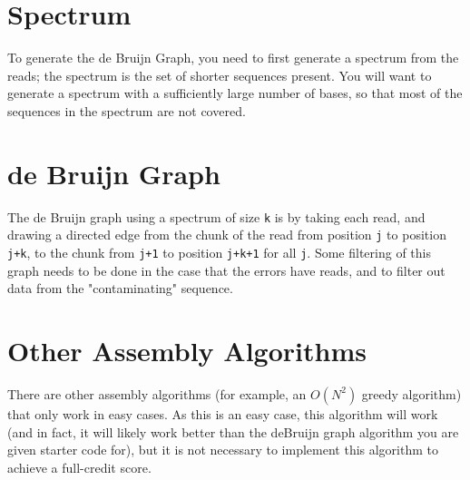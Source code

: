 \documentclass{article}
\begin{document}
\section*{Spectrum}

To generate the de Bruijn Graph, you need to first generate a spectrum from the reads; the spectrum is the set of shorter sequences present.  You will want to generate a spectrum with a sufficiently large number of bases, so that most of the sequences in the spectrum are not covered.

\section*{de Bruijn Graph}

The de Bruijn graph using a spectrum of size \verb|k| is by taking each read, and drawing a directed edge from the chunk of the read from position \verb|j| to position \verb|j+k|, to the chunk from \verb|j+1| to position \verb|j+k+1| for all \verb|j|. Some filtering of this graph needs to be done in the case that the errors have reads, and to filter out data from the "contaminating" sequence.


\section*{Other Assembly Algorithms}

There are other assembly algorithms (for example, an $O(N^2)$ greedy algorithm) that only work in easy cases. As this is an easy case, this algorithm will work (and in fact, it will likely work better than the deBruijn graph algorithm you are given starter code for), but it is not necessary to implement this algorithm to achieve a full-credit score.
\end{document}
